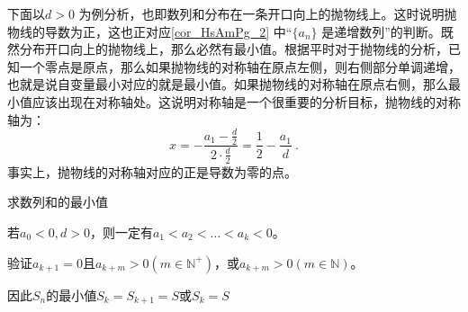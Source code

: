 下面以$d > 0$ 为例分析，也即数列和分布在一条开口向上的抛物线上。这时说明抛物线的导数为正，这也正对应\autoref{cor_HsAmPg_2} 中“$\{a_n\}$ 是递增数列”的判断。既然分布开口向上的抛物线上，那么必然有最小值。根据平时对于抛物线的分析，已知一个零点是原点，那么如果抛物线的对称轴在原点左侧，则右侧部分单调递增，也就是说自变量最小对应的就是最小值。如果抛物线的对称轴在原点右侧，那么最小值应该出现在对称轴处。这说明对称轴是一个很重要的分析目标，抛物线的对称轴为：
\begin{equation}
x=-\frac{a_1-\frac{d}{2}}{2\cdot\frac{d}{2}}=\frac{1}{2}-\frac{a_1}{d}~.
\end{equation}
事实上，抛物线的对称轴对应的正是导数为零的点。


求数列和的最小值

若$a_0<0,d>0$，则一定有$a_1<a_2<\dots<a_{k}<0$。

验证$a_{k+1} =0$且$a_{k+m}>0(m\in\mathbb{N}^+)$，或$a_{k+m}>0(m\in\mathbb{N})$。

因此$S_n$的最小値$S_k=S_{k+1}=S$或$S_k=S$
